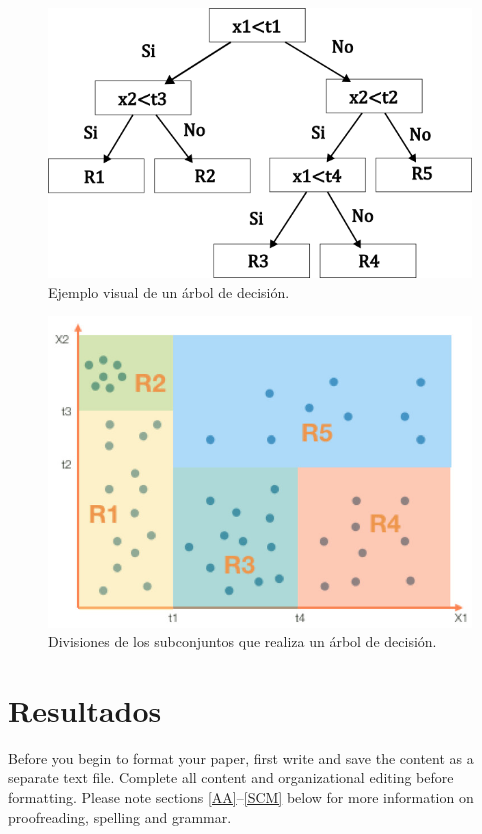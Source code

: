 \documentclass[conference]{IEEEtran}
\begin{document}
\begin{figure}[h]
    \centering
    \includegraphics[scale=0.5]{2.png}
    \caption{Ejemplo visual de un árbol de decisión.}
    \label{fig:mesh1}
\end{figure}

\begin{figure}[h]
    \centering
    \includegraphics[scale=0.6]{3.jpg}
    \caption{Divisiones de los subconjuntos que realiza un árbol de decisión.}
    \label{fig:mesh1}
\end{figure}

\section{Resultados}
Before you begin to format your paper, first write and save the content as a 
separate text file. Complete all content and organizational editing before 
formatting. Please note sections \ref{AA}--\ref{SCM} below for more information on 
proofreading, spelling and grammar.
\end{document}

